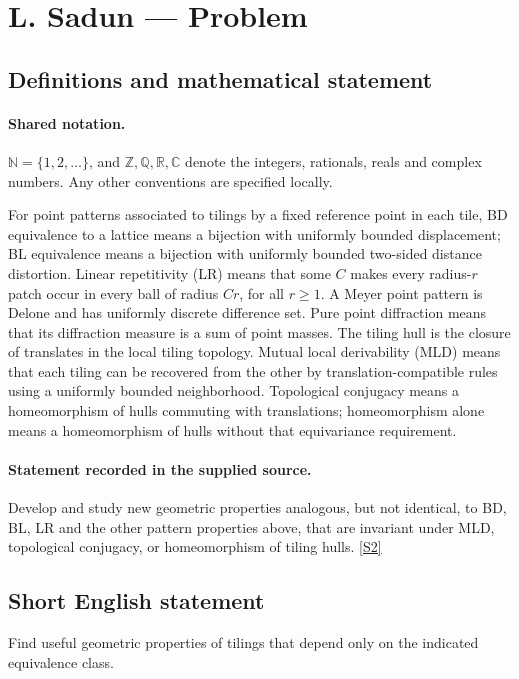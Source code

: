 \documentclass[11pt]{article}
\newcommand{\sref}[2]{\hyperlink{source:#1:#2}{[S#2]}}
\begin{document}
\section{L. Sadun — Problem}\label{statement}

\subsection{Definitions and mathematical statement}

\paragraph{Shared notation.}$\mathbb N=\{1,2,\ldots\}$, and $\mathbb Z,\mathbb Q,\mathbb R,\mathbb C$ denote the integers, rationals, reals and complex numbers. Any other conventions are specified locally.


For point patterns associated to tilings by a fixed reference point in each tile, BD equivalence to a lattice means a bijection with uniformly bounded displacement; BL equivalence means a bijection with uniformly bounded two-sided distance distortion. Linear repetitivity (LR) means that some $C$ makes every radius-$r$ patch occur in every ball of radius $Cr$, for all $r\geq1$. A Meyer point pattern is Delone and has uniformly discrete difference set. Pure point diffraction means that its diffraction measure is a sum of point masses. The tiling hull is the closure of translates in the local tiling topology. Mutual local derivability (MLD) means that each tiling can be recovered from the other by translation-compatible rules using a uniformly bounded neighborhood. Topological conjugacy means a homeomorphism of hulls commuting with translations; homeomorphism alone means a homeomorphism of hulls without that equivariance requirement.
\paragraph{Statement recorded in the supplied source.}
Develop and study new geometric properties analogous, but not identical, to BD, BL, LR and the other pattern properties above, that are invariant under MLD, topological conjugacy, or homeomorphism of tiling hulls. \sref{statement}{2}
\subsection{Short English statement}
Find useful geometric properties of tilings that depend only on the indicated equivalence class.
\end{document}
